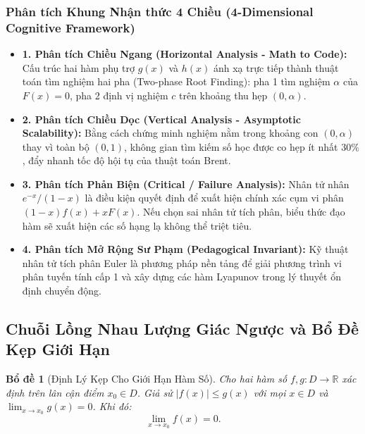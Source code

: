 \documentclass{article}
\newtheorem{bode}{Bổ đề}
\begin{document}
\subsubsection*{Phân tích Khung Nhận thức 4 Chiều (4-Dimensional Cognitive Framework)}
\begin{itemize}
    \item \textbf{1. Phân tích Chiều Ngang (Horizontal Analysis - Math to Code):} Cấu trúc hai hàm phụ trợ $g(x)$ và $h(x)$ ánh xạ trực tiếp thành thuật toán tìm nghiệm hai pha (Two-phase Root Finding): pha 1 tìm nghiệm $\alpha$ của $F(x) = 0$, pha 2 định vị nghiệm $c$ trên khoảng thu hẹp $(0, \alpha)$.
    \item \textbf{2. Phân tích Chiều Dọc (Vertical Analysis - Asymptotic Scalability):} Bằng cách chứng minh nghiệm nằm trong khoảng con $(0, \alpha)$ thay vì toàn bộ $(0, 1)$, không gian tìm kiếm số học được co hẹp ít nhất $30\%$, đẩy nhanh tốc độ hội tụ của thuật toán Brent.
    \item \textbf{3. Phân tích Phản Biện (Critical / Failure Analysis):} Nhân tử nhân $e^{-x}/(1-x)$ là điều kiện quyết định để xuất hiện chính xác cụm vi phân $(1-x)f(x) + x F(x)$. Nếu chọn sai nhân tử tích phân, biểu thức đạo hàm sẽ xuất hiện các số hạng lạ không thể triệt tiêu.
    \item \textbf{4. Phân tích Mở Rộng Sư Phạm (Pedagogical Invariant):} Kỹ thuật nhân tử tích phân Euler là phương pháp nền tảng để giải phương trình vi phân tuyến tính cấp 1 và xây dựng các hàm Lyapunov trong lý thuyết ổn định chuyển động.
\end{itemize}

\subsection{Chuỗi Lồng Nhau Lượng Giác Ngược và Bổ Đề Kẹp Giới Hạn}

\begin{bode}[Định Lý Kẹp Cho Giới Hạn Hàm Số]
Cho hai hàm số $f, g: D \to \mathbb{R}$ xác định trên lân cận điểm $x_0 \in D$. Giả sử $|f(x)| \le g(x)$ với mọi $x \in D$ và $\lim_{x \to x_0} g(x) = 0$. Khi đó:
\begin{equation}
    \lim_{x \to x_0} f(x) = 0.
\end{equation}
\end{bode}
\end{document}
